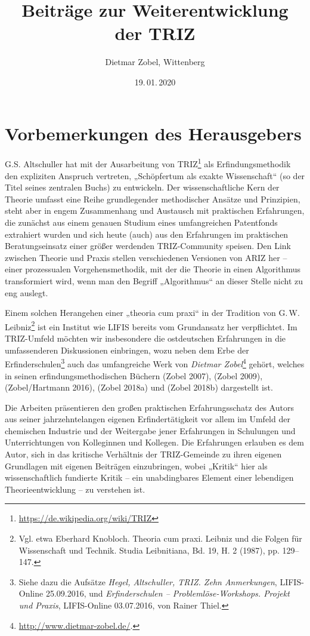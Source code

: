 \documentclass[12pt,a4paper]{article}
\title{Beiträge zur Weiterentwicklung der TRIZ}
\author{Dietmar Zobel, Wittenberg}
\date{19.\,01.\,2020}
\begin{document}
\maketitle

\section*{Vorbemerkungen des Herausgebers}

G.S. Altschuller hat mit der Ausarbeitung von
TRIZ\footnote{\url{https://de.wikipedia.org/wiki/TRIZ}} als Erfindungsmethodik
den expliziten Anspruch vertreten, „Schöpfertum als exakte Wissenschaft“ (so
der Titel seines zentralen Buchs) zu entwickeln.  Der wissenschaftliche Kern
der Theorie umfasst eine Reihe grundlegender methodischer Ansätze und
Prinzipien, steht aber in engem Zusammenhang und Austausch mit praktischen
Erfahrungen, die zunächst aus einem genauen Studium eines umfangreichen
Patentfonds extrahiert wurden und sich heute (auch) aus den Erfahrungen im
praktischen Beratungseinsatz einer größer werdenden TRIZ-Community speisen.
Den Link zwischen Theorie und Praxis stellen verschiedenen Versionen von ARIZ
her -- einer prozessualen Vorgehensmethodik, mit der die Theorie in einen
Algorithmus transformiert wird, wenn man den Begriff „Algorithmus“ an dieser
Stelle nicht zu eng auslegt.

Einem solchen Herangehen einer „theoria cum praxi“ in der Tradition von
G.\,W.\,Leibniz\footnote{Vgl. etwa Eberhard Knobloch. Theoria cum praxi.
  Leibniz und die Folgen für Wissenschaft und Technik. Studia Leibnitiana,
  Bd. 19, H. 2 (1987), pp. 129--147.} ist ein Institut wie LIFIS bereits vom
Grundansatz her verpflichtet.  Im TRIZ-Umfeld möchten wir insbesondere die
ostdeutschen Erfahrungen in die umfassenderen Diskussionen einbringen, wozu
neben dem Erbe der Erfinderschulen\footnote{Siehe dazu die Aufsätze
  \emph{Hegel, Altschuller, TRIZ. Zehn Anmerkungen}, LIFIS-Online 25.09.2016,
  und \emph{Erfinderschulen – Problemlöse-Workshops. Projekt und Praxis},
  LIFIS-Online 03.07.2016, von Rainer Thiel.} auch das umfangreiche Werk von
\emph{Dietmar Zobel}\footnote{\url{http://www.dietmar-zobel.de/}.} gehört,
welches in seinen erfindungsmethodischen Büchern (Zobel 2007), (Zobel 2009),
(Zobel/Hartmann 2016), (Zobel 2018a) und (Zobel 2018b) dargestellt ist.

Die Arbeiten präsentieren den großen praktischen Erfahrungsschatz des Autors
aus seiner jahrzehntelangen eigenen Erfindertätigkeit vor allem im Umfeld der
chemischen Industrie und der Weitergabe jener Erfahrungen in Schulungen und
Unterrichtungen von Kolleginnen und Kollegen.  Die Erfahrungen erlauben es dem
Autor, sich in das kritische Verhältnis der TRIZ-Gemeinde zu ihren eigenen
Grundlagen mit eigenen Beiträgen einzubringen, wobei „Kritik“ hier als
wissenschaftlich fundierte Kritik -- ein unabdingbares Element einer
lebendigen Theorieentwicklung -- zu verstehen ist.
\end{document}
